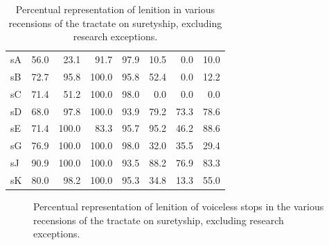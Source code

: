 \begin{table}[h]
  \centering
    \begin{tabular}{lddddddd}
    \toprule
       &  &  &  &  &  &  &  \\
      \midrule
      \gls{sA} & 56.0 & 23.1 & 91.7 & 97.9 & 10.5 & 0.0 & 10.0 \\
      \gls{sB} & 72.7 & 95.8 & 100.0 & 95.8 & 52.4 & 0.0 & 12.2 \\
      \gls{sC} & 71.4 & 51.2 & 100.0 & 98.0 & 0.0 & 0.0 & 0.0 \\
      \gls{sD} & 68.0 & 97.8 & 100.0 & 93.9 & 79.2 & 73.3 & 78.6 \\
      \gls{sE} & 71.4 & 100.0 & 83.3 & 95.7 & 95.2 & 46.2 & 88.6 \\
      \gls{sG} & 76.9 & 100.0 & 100.0 & 98.0 & 32.0 & 35.5 & 29.4 \\
      \gls{sJ} & 90.9 & 100.0 & 100.0 & 93.5 & 88.2 & 76.9 & 83.3 \\
      \gls{sK} & 80.0 & 98.2 & 100.0 & 95.3 & 34.8 & 13.3 & 55.0 \\
      \bottomrule
    \end{tabular}%
    \caption{Percentual representation of lenition in various recensions of the tractate on suretyship, excluding research exceptions.}
    \label{tab:lenlawcountryexcre}%
  \end{table}%

  \begin{figure}[h]
    \centering
    \caption{Percentual representation of lenition of voiceless stops in the various recensions of the tractate on suretyship, excluding research exceptions.}
    \label{fig:barchartlaws}
  \end{figure}

